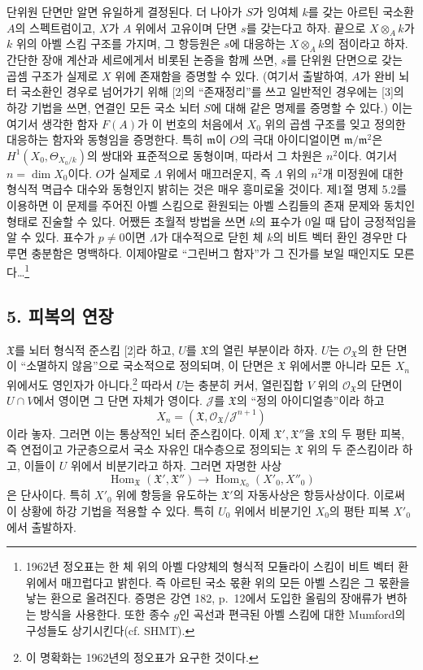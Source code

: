 단위원 단면만 알면 유일하게 결정된다. 더 나아가 $S$가 잉여체 $k$를 갖는
아르틴 국소환 $A$의 스펙트럼이고, $X$가 $A$ 위에서 고유이며 단면 $s$를
갖는다고 하자. 끝으로 $X\otimes_Ak$가 $k$ 위의 아벨 스킴 구조를 가지며,
그 항등원은 $s$에 대응하는 $X\otimes_Ak$의 점이라고 하자. 간단한 장애
계산과 세르에게서 비롯된 논증을 함께 쓰면, $s$를 단위원 단면으로 갖는
곱셈 구조가 실제로 $X$ 위에 존재함을 증명할 수 있다. (여기서 출발하여,
$A$가 완비 뇌터 국소환인 경우로 넘어가기 위해 [2]의 ``존재정리''를 쓰고
일반적인 경우에는 [3]의 하강 기법을 쓰면, 연결인 모든 국소 뇌터 $S$에
대해 같은 명제를 증명할 수 있다.) 이는 여기서 생각한 함자 $F(A)$가 이
번호의 처음에서 $X_0$ 위의 곱셈 구조를 잊고 정의한 대응하는 함자와
동형임을 증명한다. 특히 $\mathfrak m$이 $O$의 극대 아이디얼이면
$\mathfrak m/\mathfrak m^2$은 $H^1(X_0,\Theta_{X_0/k})$의 쌍대와
표준적으로 동형이며, 따라서 그 차원은 $n^2$이다. 여기서
$n=\dim X_0$이다. $O$가 실제로 $\Lambda$ 위에서 매끄러운지, 즉
$\Lambda$ 위의 $n^2$개 미정원에 대한 형식적 멱급수 대수와 동형인지
밝히는 것은 매우 흥미로울 것이다. 제1절 명제 5.2를 이용하면 이 문제를
주어진 아벨 스킴으로 환원되는 아벨 스킴들의 존재 문제와 동치인 형태로
진술할 수 있다. 어쨌든 초월적 방법을 쓰면 $k$의 표수가 0일 때 답이
긍정적임을 알 수 있다. 표수가 $p\ne0$이면 $\Lambda$가 대수적으로 닫힌
체 $k$의 비트 벡터 환인 경우만 다루면 충분함은 명백하다. 이제야말로
``그린버그 함자''가 그 진가를 보일 때인지도 모른다\ldots\footnote{1962년
정오표는 한 체 위의 아벨 다양체의 형식적 모듈라이 스킴이 비트 벡터 환 위에서
매끄럽다고 밝힌다. 즉 아르틴 국소 몫환 위의 모든 아벨 스킴은 그 몫환을
낳는 환으로 올려진다. 증명은 강연 182, p.~12에서 도입한 올림의 장애류가
변하는 방식을 사용한다. 또한 종수 $g$인 곡선과 편극된 아벨 스킴에 대한
Mumford의 구성들도 상기시킨다(cf. SHMT).}
\subsection*{5. 피복의 연장}

$\mathfrak X$를 뇌터 형식적 준스킴 [2]라 하고, $U$를 $\mathfrak X$의
열린 부분이라 하자. $U$는 $\mathcal O_{\mathfrak X}$의 한 단면이
``소멸하지 않음''으로 국소적으로 정의되며, 이 단면은 $\mathfrak X$ 위에서뿐
아니라 모든 $X_n$ 위에서도 영인자가 아니다.\footnote{이 명확화는 1962년의
정오표가 요구한 것이다.} 따라서 $U$는 충분히 커서, 열린집합 $V$ 위의
$\mathcal O_{\mathfrak X}$의 단면이 $U\cap V$에서 영이면 그 단면 자체가
영이다. $\mathcal J$를 $\mathfrak X$의 ``정의 아이디얼층''이라 하고
\[
  X_n=(\mathfrak X,\mathcal O_{\mathfrak X}/\mathcal J^{n+1})
\]
이라 놓자. 그러면 이는 통상적인 뇌터 준스킴이다. 이제
$\mathfrak X',\mathfrak X''$을 $\mathfrak X$의 두 평탄 피복, 즉 연접이고
가군층으로서 국소 자유인 대수층으로 정의되는 $\mathfrak X$ 위의 두
준스킴이라 하고, 이들이 $U$ 위에서 비분기라고 하자. 그러면 자명한 사상
\[
  \operatorname{Hom}_{\mathfrak X}(\mathfrak X',\mathfrak X'')
  \longrightarrow
  \operatorname{Hom}_{X_0}(X'_0,X''_0)
\]
은 단사이다. 특히 $X'_0$ 위에 항등을 유도하는 $\mathfrak X'$의
자동사상은 항등사상이다. 이로써 이 상황에 하강 기법을 적용할 수 있다.
특히 $U_0$ 위에서 비분기인 $X_0$의 평탄 피복 $X'_0$에서 출발하자.

